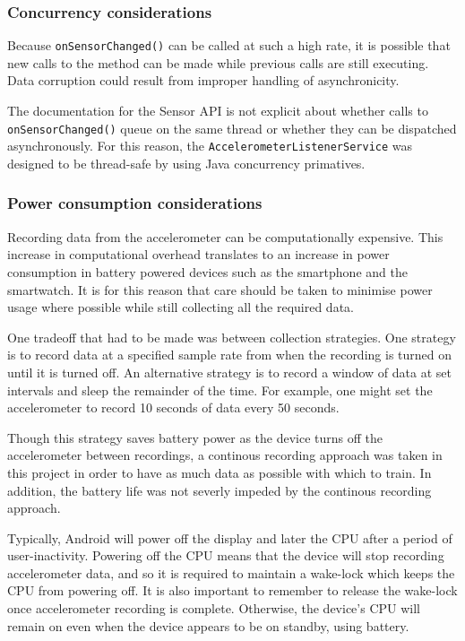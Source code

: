       \subsubsection{Concurrency considerations}
        Because \texttt{onSensorChanged()} can be called at such a high rate, it is possible that new calls to the method can be made while previous calls are still executing. Data corruption could result from improper handling of asynchronicity.
      
        The documentation for the Sensor API is not explicit about whether calls to \texttt{onSensorChanged()} queue on the same thread or whether they can be dispatched asynchronously. For this reason, the \texttt{AccelerometerListenerService} was designed to be thread-safe by using Java concurrency primatives.
      
      \subsubsection{Power consumption considerations}
        Recording data from the accelerometer can be computationally expensive. This increase in computational overhead translates to an increase in power consumption in battery powered devices such as the smartphone and the smartwatch. It is for this reason that care should be taken to minimise power usage where possible while still collecting all the required data.
        
        One tradeoff that had to be made was between collection strategies. One strategy is to record data at a specified sample rate from when the recording is turned on until it is turned off. An alternative strategy is to record a window of data at set intervals and sleep the remainder of the time. For example, one might set the accelerometer to record 10 seconds of data every 50 seconds.
        
        Though this strategy saves battery power as the device turns off the accelerometer between recordings, a continous recording approach was taken in this project in order to have as much data as possible with which to train. In addition, the battery life was not severly impeded by the continous recording approach.
        
        Typically, Android will power off the display and later the CPU after a period of user-inactivity. Powering off the CPU means that the device will stop recording accelerometer data, and so it is required to maintain a wake-lock which keeps the CPU from powering off. It is also important to remember to release the wake-lock once accelerometer recording is complete. Otherwise, the device's CPU will remain on even when the device appears to be on standby, using battery.
        
